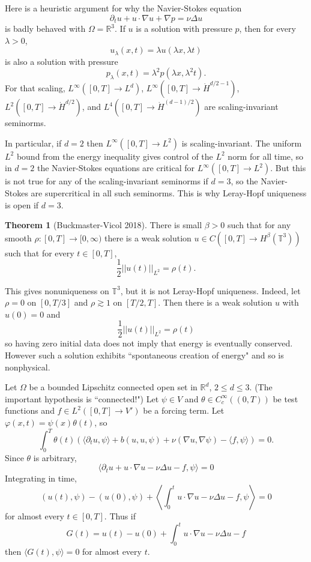 \documentclass[12pt]{book}
\newcommand{\RR}{\mathbb{R}}
\newcommand{\Torus}{\mathbb{T}}
\theoremstyle{definition}
\newtheorem{theorem}{Theorem}[chapter]
\begin{document}
Here is a heuristic argument for why the Navier-Stokes equation
$$\partial_t u + u \cdot \nabla u + \nabla p = \nu \Delta u$$
is badly behaved with $\Omega = \RR^3$.
If $u$ is a solution with pressure $p$, then for every $\lambda > 0$,
$$u_\lambda(x, t) = \lambda u(\lambda x, \lambda t)$$
is also a solution with pressure
$$p_\lambda(x, t) = \lambda^2 p(\lambda x, \lambda^2 t).$$
For that scaling, $L^\infty([0, T] \to L^d)$, $L^\infty([0, T] \to \dot H^{d/2 - 1})$, $L^2([0, T] \to \dot H^{d/2})$, and $L^4([0, T] \to \dot H^{(d-1)/2})$ are scaling-invariant seminorms.

In particular, if $d = 2$ then $L^\infty([0, T] \to L^2)$ is scaling-invariant.
The uniform $L^2$ bound from the energy inequality gives control of the $L^2$ norm for all time, so in $d = 2$ the Navier-Stokes equations are critical for $L^\infty([0, T] \to L^2)$.
But this is not true for any of the scaling-invariant seminorms if $d = 3$, so the Navier-Stokes are supercritical in all such seminorms.
This is why Leray-Hopf uniqueness is open if $d = 3$.

\begin{theorem}[Buckmaster-Vicol 2018]
There is small $\beta > 0$ such that for any smooth $\rho: [0, T] \to [0, \infty)$ there is a weak solution $u \in C([0, T] \to H^\beta(\Torus^3))$ such that for every $t \in [0, T]$,
$$\frac{1}{2} ||u(t)||_{L^2} = \rho(t).$$
\end{theorem}

This gives nonuniqueness on $\Torus^3$, but it is not Leray-Hopf uniqueness.
Indeed, let $\rho = 0$ on $[0, T/3]$ and $\rho \gtrsim 1$ on $[T/2, T]$.
Then there is a weak solution $u$ with $u(0) = 0$ and
$$\frac{1}{2} ||u(t)||_{L^2} = \rho(t)$$
so having zero initial data does not imply that energy is eventually conserved.
However such a solution exhibits ``spontaneous creation of energy" and so is nonphysical.

Let $\Omega$ be a bounded Lipschitz connected open set in $\RR^d$, $2 \leq d \leq 3$.
(The important hypothesis is ``connected!")
Let $\psi \in V$ and $\theta \in C^\infty_c((0, T))$ be test functions and $f \in L^2([0, T] \to V')$ be a forcing term.
Let $\varphi(x, t) = \psi(x) \theta(t)$, so
$$\int_0^T \theta(t) \left(\langle \partial_t u, \psi\rangle + b(u, u, \psi) + \nu(\nabla u, \nabla \psi) - \langle f,\psi\rangle\right) = 0.$$
Since $\theta$ is arbitrary,
$$\langle \partial_t u + u \cdot \nabla u - \nu \Delta u - f, \psi\rangle = 0$$
Integrating in time,
$$(u(t), \psi) - (u(0), \psi) + \left\langle \int_0^t u \cdot \nabla u - \nu \Delta u - f, \psi\right\rangle = 0$$
for almost every $t \in [0, T]$.
Thus if
$$G(t) = u(t) - u(0) + \int_0^t u \cdot \nabla u - \nu \Delta u - f$$
then $\langle G(t), \psi\rangle = 0$ for almost every $t$.
\end{document}
